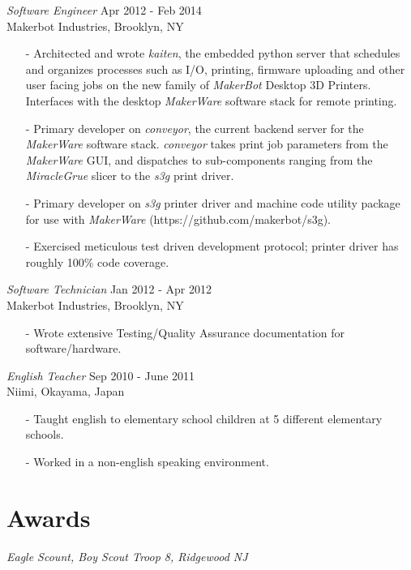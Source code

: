 \documentclass[margin, 10pt]{res} %
\begin{document}
\begin{resume}
{\sl Software Engineer} \hfill Apr 2012 - Feb 2014 \\
Makerbot Industries, Brooklyn, NY
\begin{itemize} \itemsep -2pt
\item[-] Architected and wrote \textit{kaiten}, the embedded python server that schedules and organizes processes such as I/O, printing, firmware uploading and other user facing jobs on the new family of \textit{MakerBot} Desktop 3D Printers.  Interfaces with the desktop \textit{MakerWare} software stack for remote printing.
\item[-] Primary developer on \textit{conveyor}, the current backend server for the \textit{MakerWare} software stack.  \textit{conveyor} takes print job parameters from the \textit{MakerWare} GUI, and dispatches to sub-components ranging from the \textit{MiracleGrue} slicer to the \textit{s3g} print driver.
\item[-] Primary developer on \textit{s3g} printer driver and machine code utility package for use with \textit{MakerWare} (https://github.com/makerbot/s3g).
\item[-] Exercised meticulous test driven development protocol; printer driver has roughly 100\% code coverage.
\end{itemize}

{\sl Software Technician} \hfill Jan 2012 - Apr 2012 \\
Makerbot Industries, Brooklyn, NY
\begin{itemize} \itemsep -2pt
\item[-] Wrote extensive Testing/Quality Assurance documentation for software/hardware.
\end{itemize}

{\sl English Teacher} \hfill Sep 2010 - June 2011\\
Niimi, Okayama, Japan
\begin{itemize} \itemsep -2pt
\item[-] Taught english to elementary school children at 5 different elementary schools.
\item[-] Worked in a non-english speaking environment.
\end{itemize}


\section{Awards} 

{\sl Eagle Scount, Boy Scout Troop 8, Ridgewood NJ} \\

\end{resume}
\end{document}
